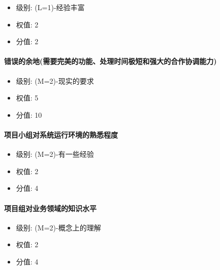 \documentclass[hyperref, a4paper]{ctexart}
\providecommand{\tightlist}{%
  \setlength{\itemsep}{0pt}\setlength{\parskip}{0pt}}
\let\oldparagraph\paragraph
\renewcommand{\paragraph}[1]{\oldparagraph{#1}\mbox{}}
\begin{document}
\begin{itemize}
\tightlist
\item
  级别: (L=1)-经验丰富
\item
  权值: 2
\item
  分值: 2
\end{itemize}

\hypertarget{ux9519ux8befux7684ux4f59ux5730ux9700ux8981ux5b8cux7f8eux7684ux529fux80fdux5904ux7406ux65f6ux95f4ux6781ux77edux548cux5f3aux5927ux7684ux5408ux4f5cux534fux8c03ux80fdux529b}{%
\paragraph{错误的余地(需要完美的功能、处理时间极短和强大的合作协调能力)}\label{ux9519ux8befux7684ux4f59ux5730ux9700ux8981ux5b8cux7f8eux7684ux529fux80fdux5904ux7406ux65f6ux95f4ux6781ux77edux548cux5f3aux5927ux7684ux5408ux4f5cux534fux8c03ux80fdux529b}}

\begin{itemize}
\tightlist
\item
  级别: (M=2)-现实的要求
\item
  权值: 5
\item
  分值: 10
\end{itemize}

\hypertarget{ux9879ux76eeux5c0fux7ec4ux5bf9ux7cfbux7edfux8fd0ux884cux73afux5883ux7684ux719fux6089ux7a0bux5ea6}{%
\paragraph{项目小组对系统运行环境的熟悉程度}\label{ux9879ux76eeux5c0fux7ec4ux5bf9ux7cfbux7edfux8fd0ux884cux73afux5883ux7684ux719fux6089ux7a0bux5ea6}}

\begin{itemize}
\tightlist
\item
  级别: (M=2)-有一些经验
\item
  权值: 2
\item
  分值: 4
\end{itemize}

\hypertarget{ux9879ux76eeux7ec4ux5bf9ux4e1aux52a1ux9886ux57dfux7684ux77e5ux8bc6ux6c34ux5e73}{%
\paragraph{项目组对业务领域的知识水平}\label{ux9879ux76eeux7ec4ux5bf9ux4e1aux52a1ux9886ux57dfux7684ux77e5ux8bc6ux6c34ux5e73}}

\begin{itemize}
\tightlist
\item
  级别: (M=2)-概念上的理解
\item
  权值: 2
\item
  分值: 4
\end{itemize}
\end{document}
